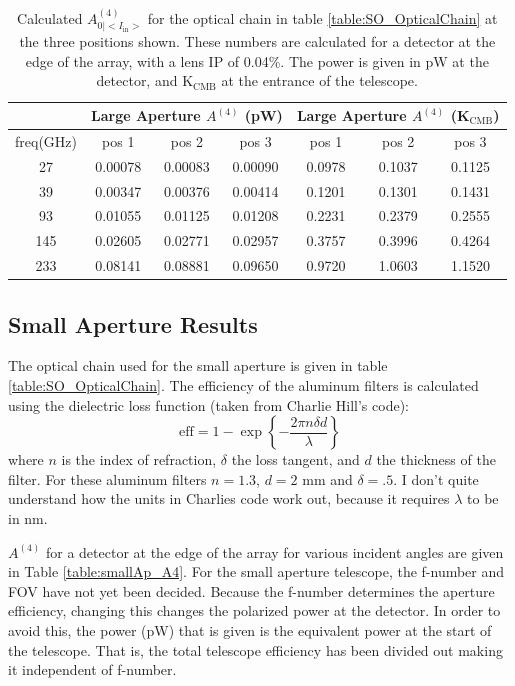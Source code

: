\documentclass{article}
\theoremstyle{remark}
\renewcommand{\t}[1]{\text{#1}}
\newcommand{\AI}{A^{(4)}_{0|<I_{\t{in}}>}}
\newcommand{\A}[1]{A^{(#1)}}
\begin{document}
\begin{table}
\centering
\begin{tabular}{ |c|c|c|c|c|c|c| } 
  \hline
   & \multicolumn{3}{|c|}{Large Aperture $\A4$ (pW)} & \multicolumn{3}{|c|}{Large Aperture $\A4$ (K$_\t{CMB}$)}\\ 
  \hline
  freq(GHz) & pos 1   & pos 2 & pos 3 & pos 1 & pos 2 & pos 3\\ \hline
 27 &  0.00078 & 0.00083 & 0.00090 & 0.0978 & 0.1037 & 0.1125 \\ 
 39 &  0.00347 & 0.00376 & 0.00414 & 0.1201 & 0.1301 & 0.1431 \\ 
 93 &  0.01055 & 0.01125 & 0.01208 & 0.2231 & 0.2379 & 0.2555 \\ 
145 &  0.02605 & 0.02771 & 0.02957 & 0.3757 & 0.3996 & 0.4264\\ 
233 &  0.08141 & 0.08881 & 0.09650 & 0.9720 & 1.0603 & 1.1520\\ 
  \hline  
\end{tabular}
\caption{ Calculated $\AI$ for the optical chain in table \ref{table:SO_OpticalChain} at the three positions shown.
These numbers are calculated for a detector at the edge of the array, with a lens IP of 0.04\%.
The power is given in pW at the detector, and K$_\text{CMB}$ at the entrance of the telescope.
}
\label{table:SO_powers}
\end{table}


\subsection{Small Aperture Results}

The optical chain used for the small aperture is given in table \ref{table:SO_OpticalChain}. 
The efficiency of the aluminum filters is calculated using the dielectric loss function (taken from Charlie Hill's code):
\[\t{eff} = 1 - \exp\left\{- \frac{2 \pi n \delta d}{\lambda}\right\}\]
where $n$ is the index of refraction, $\delta$ the loss tangent, and $d$ the thickness of the filter.
For these aluminum filters $n = 1.3$, $d = 2\text{ mm}$ and $\delta = .5$. 
I don't quite understand how the units in Charlies code work out, because it requires $\lambda$ to be in nm.

$\A4$ for a detector at the edge of the array for various incident angles are given in Table \ref{table:smallAp_A4}.
For the small aperture telescope, the f-number and FOV have not yet been decided. 
Because the f-number determines the aperture efficiency, changing this changes the polarized power at the detector.
In order to avoid this, the power (pW) that is given is the equivalent power at the start of the telescope.
That is, the total telescope efficiency has been divided out making it independent of f-number.
\end{document}
